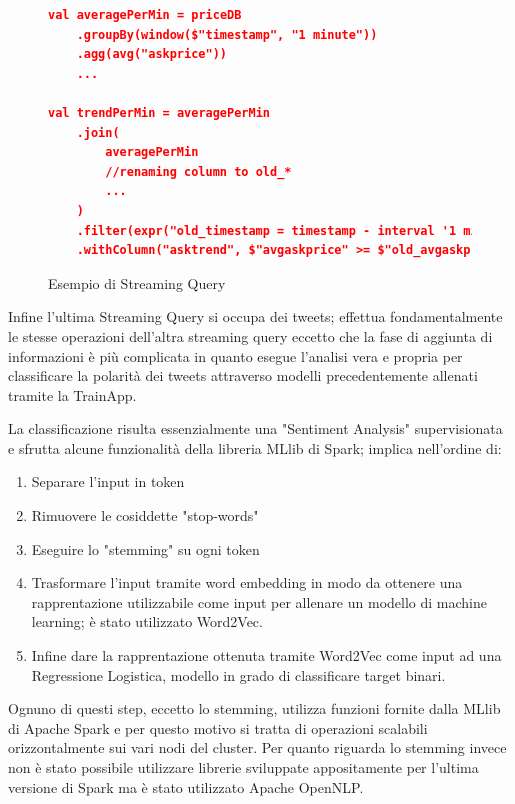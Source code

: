 \begin{figure}
    \begin{lstlisting}[language=json,firstnumber=1]
val averagePerMin = priceDB
    .groupBy(window($"timestamp", "1 minute"))
    .agg(avg("askprice"))
    ...

val trendPerMin = averagePerMin
    .join(
        averagePerMin
        //renaming column to old_*
        ...
    )
    .filter(expr("old_timestamp = timestamp - interval '1 minute'"))
    .withColumn("asktrend", $"avgaskprice" >= $"old_avgaskprice")
    \end{lstlisting}
    \caption{Esempio di Streaming Query}
    \label{trendpermin}
\end{figure}

Infine l'ultima Streaming Query si occupa dei tweets; effettua fondamentalmente le stesse operazioni
dell'altra streaming query eccetto che la fase di aggiunta di informazioni è più complicata in quanto
esegue l'analisi vera e propria per classificare la polarità dei tweets attraverso modelli
precedentemente allenati tramite la TrainApp.

La classificazione risulta essenzialmente una "Sentiment Analysis" supervisionata e sfrutta alcune
funzionalità della libreria MLlib di Spark; implica nell'ordine di:

\begin{enumerate}
    \item Separare l'input in token
    \item Rimuovere le cosiddette "stop-words"
    \item Eseguire lo "stemming" su ogni token
    \item Trasformare l'input tramite word embedding in modo da ottenere una rapprentazione
    utilizzabile come input per allenare un modello di machine learning; è stato utilizzato
    Word2Vec.
    \item Infine dare la rapprentazione ottenuta tramite Word2Vec come input ad una Regressione
    Logistica, modello in grado di classificare target binari.
\end{enumerate}

Ognuno di questi step, eccetto lo stemming, utilizza funzioni fornite dalla MLlib di Apache Spark
e per questo motivo si tratta di operazioni scalabili orizzontalmente sui vari nodi del cluster.
Per quanto riguarda lo stemming invece non è stato possibile utilizzare librerie sviluppate
appositamente per l'ultima versione di Spark ma è stato utilizzato Apache OpenNLP.

